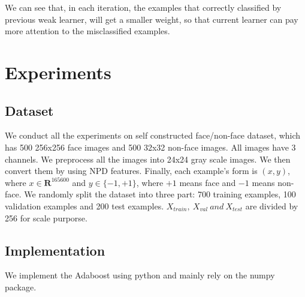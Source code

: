 \documentclass[journal, a4paper]{IEEEtran}
\begin{document}
We can see that, in each iteration, the examples that correctly classified by previous weak learner, will get a smaller weight, so that current learner can pay more attention to the misclassified examples. 


\section{Experiments}
\subsection{Dataset}
We conduct all the experiments on self constructed face/non-face dataset, which has 500 256x256 face images and 500 32x32 non-face images. All images have 3 channels. We preprocess all the images into 24x24 gray scale images. We then convert them by using NPD features. Finally, each example's form is $(x, y)$, where $x \in \mathbf{R}^{165600}$ and $y \in \{-1, +1\}$, where $+1$ means face and $-1$ means non-face. We randomly split the dataset into three part: 700 training examples, 100 validation examples and 200 test examples. $X_{train},~X_{val}~and~X_{test} $ are divided by 256 for scale purporse.

\subsection{Implementation}
We implement the Adaboost using python and mainly rely on the numpy package.
\end{document}
